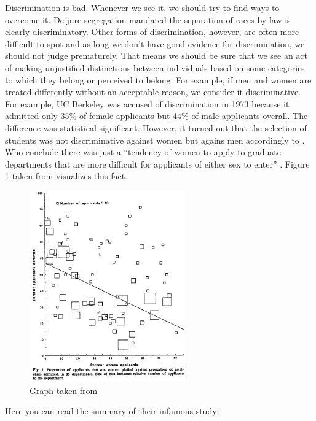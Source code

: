 \documentclass[
  12pt,
  oneside]{book}
\theoremstyle{definition}
\theoremstyle{definition}
\theoremstyle{definition}
\theoremstyle{definition}
\theoremstyle{remark}
\begin{document}
Discrimination is bad. Whenever we see it, we should try to find ways to overcome it. De jure segregation mandated the separation of races by law is clearly discriminatory. Other forms of discrimination, however, are often more difficult to spot and as long we don't have good evidence for discrimination, we should not judge prematurely. That means we should be sure that we see an act of making unjustified distinctions between individuals based on some categories to which they belong or perceived to belong. For example, if men and women are treated differently without an acceptable reason, we consider it discriminative. For example, UC Berkeley was accused of discrimination in 1973 because it admitted only 35\% of female applicants but 44\% of male applicants overall. The difference was statistical significant. However, it turned out that the selection of students was not discriminative against women but agains men accordingly to \citet{Bickel1975Sex}. Who conclude there was just a ``tendency of women to apply to graduate departments that are more difficult for applicants of either sex to enter'' \citep[p.~403]{Bickel1975Sex}. Figure \ref{fig:berkley} taken from \citet[page 403]{Bickel1975Sex} visualizes this fact.

\begin{figure}
\centering
\includegraphics[width=0.6\textwidth,height=\textheight]{fig/berkley.png}
\caption{\label{fig:berkley} Graph taken from \citet[page 403]{Bickel1975Sex}}
\end{figure}

Here you can read the summary of their infamous study:
\end{document}
